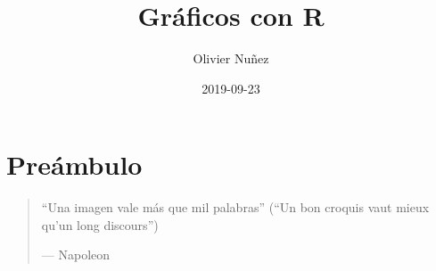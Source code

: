 \documentclass[]{article}
\title{Gráficos con R}
\author{Olivier Nuñez}
\date{2019-09-23}
\newenvironment{Shaded}{\begin{snugshade}}{\end{snugshade}}
\newcommand{\DataTypeTok}[1]{\textcolor[rgb]{0.13,0.29,0.53}{#1}}
\newcommand{\KeywordTok}[1]{\textcolor[rgb]{0.13,0.29,0.53}{\textbf{#1}}}
\newcommand{\NormalTok}[1]{#1}
\newcommand{\OperatorTok}[1]{\textcolor[rgb]{0.81,0.36,0.00}{\textbf{#1}}}
\newcommand{\OtherTok}[1]{\textcolor[rgb]{0.56,0.35,0.01}{#1}}
\numberwithin{ejcnt}{section}
\begin{document}
\maketitle

{
\setcounter{tocdepth}{2}
\tableofcontents
}
\begin{Shaded}
\end{Shaded}

\hypertarget{preambulo}{%
\section*{Preámbulo}\label{preambulo}}

\begin{quote}
``Una imagen vale más que mil palabras'' (``Un bon croquis vaut mieux qu'un long discours'')

--- Napoleon
\end{quote}
\end{document}
